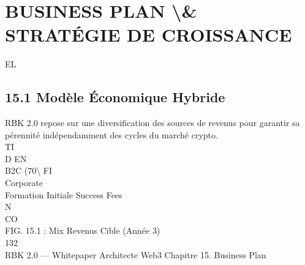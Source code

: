 \documentclass[12pt,landscape,a4paper]{article}
\begin{document}
\section{BUSINESS PLAN \textbackslash{}& STRATÉGIE DE CROISSANCE}
\vspace{0.5em}
\vspace{0.5em}
\vspace{0.5em}
\vspace{0.5em}
EL\\
\subsection{15.1 Modèle Économique Hybride}
RBK 2.0 repose sur une diversification des sources de revenus pour garantir sa pérennité indépendamment des cycles du marché crypto.\\
\vspace{0.5em}
\vspace{0.5em}
\vspace{0.5em}
\vspace{0.5em}
TI\\
D     EN\\
B2C (70\textbackslash{}%
\vspace{0.5em}
\vspace{0.5em}
\vspace{0.5em}
\vspace{0.5em}
FI\\
Corporate\\
Formation Initiale   Success Fees\\
\vspace{0.5em}
N\\
CO\\
FIG. 15.1 : Mix Revenus Cible (Année 3)\\
\vspace{0.5em}
\vspace{0.5em}
\vspace{0.5em}
\vspace{0.5em}
132\\
RBK 2.0 — Whitepaper Architecte Web3                                                                           Chapitre 15. Business Plan\\
\vspace{0.5em}
\vspace{0.5em}
\end{document}
